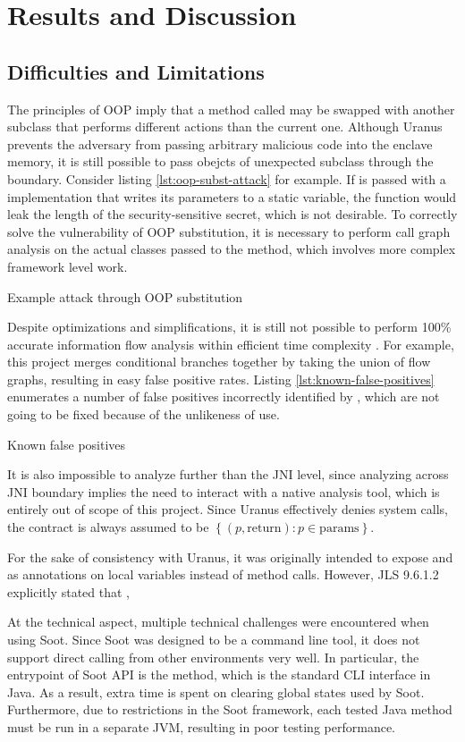 \section{Results and Discussion}
\subsection{Difficulties and Limitations}
The principles of OOP imply that a method called may be swapped with another subclass
that performs different actions than the current one.
Although Uranus prevents the adversary
from passing arbitrary malicious code into the enclave memory,
it is still possible to pass obejcts of unexpected subclass
through the  boundary.
Consider listing \ref{lst:oop-subst-attack} for example.
If  is passed with a  implementation
that writes its parameters to a static variable,
the function would leak the length of the security-sensitive secret,
which is not desirable.
To correctly solve the vulnerability of OOP substitution,
it is necessary to perform call graph analysis on the actual classes passed to the method,
which involves more complex framework level work.

{Example attack through OOP substitution}

Despite optimizations and simplifications,
it is still not possible to perform 100\% accurate information flow analysis
within efficient time complexity \cite{SmithGeoffrey2007PoSI}.
For example, this project merges conditional branches together
by taking the union of flow graphs,
resulting in easy false positive rates.
Listing \ref{lst:known-false-positives} enumerates a number of false positives
incorrectly identified by \pname{},
which are not going to be fixed because of the unlikeness of use.

{Known false positives}

It is also impossible to analyze further than the JNI level,
since analyzing across JNI boundary implies
the need to interact with a native analysis tool,
which is entirely out of scope of this project.
Since Uranus effectively denies system calls,
the contract is always assumed to be $\left\{ (p, \text{return}) : p \in \text{params} \right\}$.

For the sake of consistency with Uranus,
it was originally intended to expose  and 
as annotations on local variables instead of method calls.
However, JLS 9.6.1.2 explicitly stated that
\cite{jls},

At the technical aspect,
multiple technical challenges were encountered when using Soot.
Since Soot was designed to be a command line tool,
it does not support direct calling from other environments very well.
In particular, the entrypoint of Soot API is the  method,
which is the standard CLI interface in Java.
As a result, extra time is spent on clearing global states used by Soot.
Furthermore, due to restrictions in the Soot framework,
each tested Java method must be run in a separate JVM,
resulting in poor testing performance.
